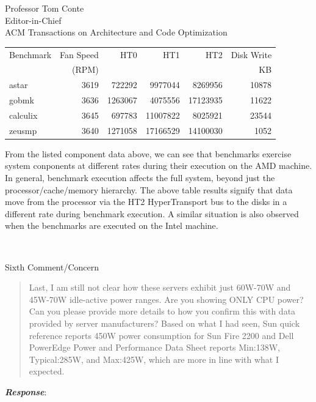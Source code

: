\documentclass[10pt]{letter} %
\newenvironment{rviewcomment}
{~\\%
\begin{bfseries}}
{\end{bfseries}}
\newcommand{\rviewresponse}{\textbf{\textit{Response}}:}
\begin{document}
\begin{letter}{Professor Tom Conte \\
Editor-in-Chief \\
ACM Transactions on Architecture and Code Optimization }
\begin{tabular}{lrrrrr}
\hline
Benchmark & Fan Speed & HT0 & HT1 & HT2 & Disk Write \\
 & (RPM) &  &  &  & KB \\
\hline
astar & 3619 & 722292 & 9977044 & 8269956 & 10878 \\
gobmk & 3636 & 1263067 & 4075556 & 17123935 & 11622 \\
calculix & 3645 & 697783 & 11007822 & 8025921 & 23544 \\
zeusmp & 3640 & 1271058 & 17166529 & 14100030 & 1052 \\
\hline
\end{tabular}

From the listed component data above, we can see that benchmarks exercise system conponents
at different rates during their execution on the AMD machine.
In general, benchmark execution affects the full system,
beyond just the processor/cache/memory hierarchy.
The above table results signify that data move from the processor
via the HT2 HyperTransport bus
to the disks in a different rate during benchmark execution.
A similar situation is also observed when the benchmarks are executed on the Intel machine. 

\begin{rviewcomment}
  Sixth Comment/Concern
\end{rviewcomment}
\begin{quote}
  \begin{itshape}
    Last, I am still not clear how these servers exhibit just 60W-70W
    and 45W-70W idle-active power ranges. Are you showing ONLY CPU
    power? Can you please provide more details to how you confirm this
    with data provided by server manufacturers?  Based on what I had
    seen, Sun quick reference reports 450W power consumption for Sun
    Fire 2200 and Dell PowerEdge Power and Performance Data Sheet
    reports Min:138W, Typical:285W, and Max:425W, which are more in line
    with what I expected.
  \end{itshape}
\end{quote}
\rviewresponse


\end{letter}
\end{document}
